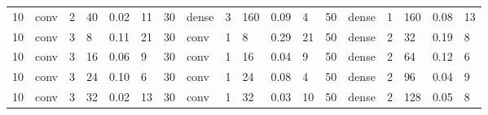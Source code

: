 \begin{table}[t!]
{\begin{tabular}{@{}llllll|llllll|llllll@{}}
10                              & conv                           & 2                              & 40                             & 0.02                             & 11                                & 30                              & dense                          & 3                              & 160                            & 0.09                           & 4                                 & 50                              & dense                          & 1                              & 160                            & 0.08                           & 13                               \\
10                              & conv                           & 3                              & 8                              & 0.11                             & 21                                & 30                              & conv                           & 1                              & 8                              & 0.29                           & 21                                & 50                              & dense                          & 2                              & 32                             & 0.19                           & 8                                \\
10                              & conv                           & 3                              & 16                             & 0.06                             & 9                                 & 30                              & conv                           & 1                              & 16                             & 0.04                           & 9                                 & 50                              & dense                          & 2                              & 64                             & 0.12                           & 6                                \\
10                              & conv                           & 3                              & 24                             & 0.10                             & 6                                 & 30                              & conv                           & 1                              & 24                             & 0.08                           & 4                                 & 50                              & dense                          & 2                              & 96                             & 0.04                           & 9                                \\
10                              & conv                           & 3                              & 32                             & 0.02                             & 13                                & 30                              & conv                           & 1                              & 32                             & 0.03                           & 10                                & 50                              & dense                          & 2                              & 128                            & 0.05                           & 8                                \\

\end{tabular}}
\end{table}
